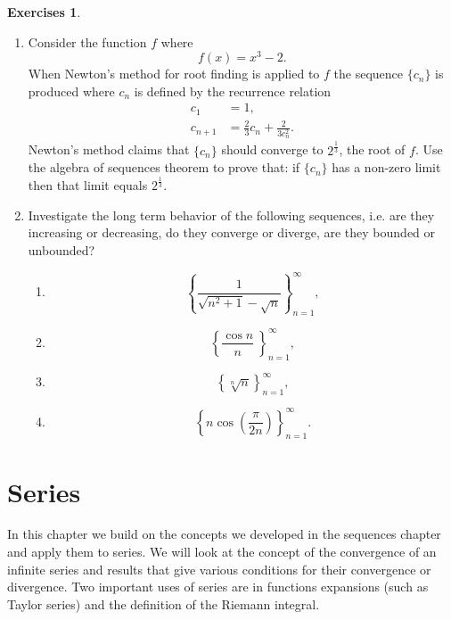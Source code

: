 \documentclass[extrafontsizes, twoside, a4paper]{memoir}
\theoremstyle{plain}%
\theoremstyle{definition}
\newtheorem{exer}{Exercises}[chapter]
\theoremstyle{remark}
\newcommand{\postitemskip}{\vskip 0.2in}
\newcommand{\summary}[1]{#1}
\begin{document}
\begin{exer}
\begin{enumerate}
 Using the algebra of sequences theorem find the limit of the following convergent sequences.
\begin{enumerate}
\item
$\{a_n\}$ where $a_n = \frac{(2n + 1) (n-2)}{n^3 + 2},$
\item
$\{ b_n \}$ where $b_n = \frac{2}{7n^2} - \frac{3n}{n^2} + \frac{2n}{7n+1}$.
\end{enumerate}
Point out carefully the places where the theorem is being used.
\postitemskip
\item
 Consider the function $f$ where
$$ f(x) = x^3 - 2 .$$
When Newton's method for root finding is applied to $f$ the sequence $\{ c_n \}$ is produced where $c_n$ is defined by the recurrence relation
\begin{align*}
c_1 & = 1 ,\\
c_{n+1} &= \frac{2}{3} c_n + \frac{2}{3 c_n^2}.
\end{align*}
Newton's method claims that $\{ c_n \}$ should converge to $2^{\frac{1}{3}}$, the root of $f$. Use the algebra of sequences theorem to prove that: if $\{ c_n \}$ has a non-zero limit then that limit equals $2^{\frac{1}{3}}$.
\postitemskip
\item
Investigate the long term behavior of the following sequences, i.e. are they increasing or decreasing, do they converge or diverge, are they bounded or unbounded?
\begin{enumerate}
\item
$$\left \{ \frac{1}{\sqrt{n^2 + 1} - \sqrt{n}} \right \}_{n=1}^\infty ,$$
\item
$$\left \{ \frac{ \cos{n}}{n} \  \right \}_{n=1}^\infty ,$$
\item
$$\left \{ \sqrt[n]{ n } \right \}_{n=1}^\infty ,$$
\item
$$\left \{ n \cos{\left ( \frac{\pi}{2n} \right )} \right \}_{n=1}^\infty .$$
\end{enumerate}
\end{enumerate}
\end{exer}
\cleardoublepage
%
\chapter{Series}
\summary{In this chapter we build on the concepts we developed in the sequences chapter and apply them to series. We will look at the concept of the convergence of an infinite series and results that give various conditions for their convergence or divergence. Two important uses of series are in functions expansions (such as Taylor series) and the definition of the Riemann integral.}
\end{document}
